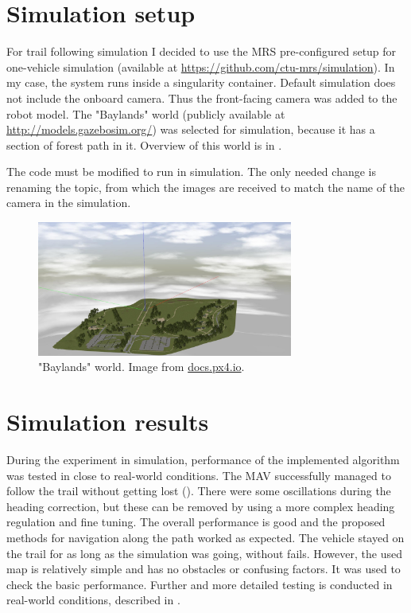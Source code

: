 \section{Simulation setup}

For trail following simulation I decided to use the \acs{MRS} pre-configured setup for one-vehicle simulation (available at \url{https://github.com/ctu-mrs/simulation}). In my case, the system runs inside a singularity container. Default simulation does not include the onboard camera. Thus the front-facing camera was added to the robot model. The "Baylands" world (publicly available at \url{http://models.gazebosim.org/}) was selected for simulation, because it has a section of forest path in it. Overview of this world is in .

The code must be modified to run in simulation. The only needed change is renaming the topic, from which the images are received to match the name of the camera in the simulation.

\begin{figure}[!h]

  \centering
  \includegraphics[width=0.75\textwidth]{./fig/photos/baylands.jpg}
  \caption{"Baylands" world. Image from \url{docs.px4.io}.}
  \label{fig:baylands}
\end{figure}


\section{Simulation results}

During the experiment in simulation, performance of the implemented algorithm was tested in close to real-world conditions. The \acs{MAV} successfully managed to follow the trail without getting lost (). There were some oscillations during the heading correction, but these can be removed by using a more complex heading regulation and fine tuning. The overall performance is good and the proposed methods for navigation along the path worked as expected. The vehicle stayed on the trail for as long as the simulation was going, without fails. However, the used map is relatively simple and has no obstacles or confusing factors. It was used to check the basic performance. Further and more detailed testing is conducted in real-world conditions, described in .


